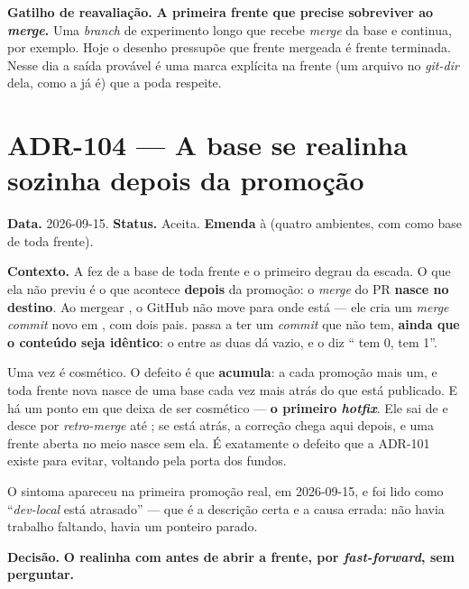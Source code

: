 \textbf{Gatilho de reavaliação.} \textbf{A primeira frente que precise
sobreviver ao \emph{merge}.} Uma \emph{branch} de experimento longo que
recebe \emph{merge} da base e continua, por exemplo. Hoje o desenho pressupõe
que frente mergeada é frente terminada. Nesse dia a saída provável é uma marca
explícita na frente (um arquivo no \emph{git-dir} dela, como a  já é)
que a poda respeite.


\section{ADR-104 --- A base se realinha sozinha depois da promoção}
\label{adr:realinhar-base}

\textbf{Data.} 2026-09-15. \textbf{Status.} Aceita.
\textbf{Emenda} à  (quatro ambientes, com  como
base de toda frente).

\textbf{Contexto.} A  fez de  a base de toda frente
e o primeiro degrau da escada. O que ela não previu é o que acontece
\textbf{depois} da promoção: o \emph{merge} do PR \textbf{nasce no destino}. Ao
mergear , o GitHub não move  para onde
 está --- ele cria um \emph{merge commit} novo em , com
dois pais.  passa a ter um \emph{commit} que  não tem,
\textbf{ainda que o conteúdo seja idêntico}: o  entre as duas dá
vazio, e o  diz \enquote{ tem 0,  tem 1}.

Uma vez é cosmético. O defeito é que \textbf{acumula}: a cada promoção mais um,
e toda frente nova nasce de uma base cada vez mais atrás do que está publicado.
E há um ponto em que deixa de ser cosmético --- \textbf{o primeiro
\emph{hotfix}}. Ele sai de  e desce por \emph{retro-merge} até
; se  está atrás, a correção chega aqui depois, e uma
frente aberta no meio nasce sem ela. É exatamente o defeito que a ADR-101
existe para evitar, voltando pela porta dos fundos.

O sintoma apareceu na primeira promoção real, em 2026-09-15, e foi lido como
\enquote{\emph{dev-local} está atrasado} --- que é a descrição certa e a causa
errada: não havia trabalho faltando, havia um ponteiro parado.

\textbf{Decisão.} \textbf{O  realinha
 com  antes de abrir a frente, por
\emph{fast-forward}, sem perguntar.}

